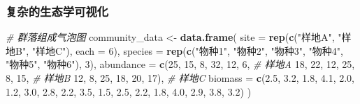 \documentclass[
]{book}
\newenvironment{Shaded}{\begin{snugshade}}{\end{snugshade}}
\newcommand{\AttributeTok}[1]{\textcolor[rgb]{0.13,0.29,0.53}{#1}}
\newcommand{\CommentTok}[1]{\textcolor[rgb]{0.56,0.35,0.01}{\textit{#1}}}
\newcommand{\DecValTok}[1]{\textcolor[rgb]{0.00,0.00,0.81}{#1}}
\newcommand{\FloatTok}[1]{\textcolor[rgb]{0.00,0.00,0.81}{#1}}
\newcommand{\FunctionTok}[1]{\textcolor[rgb]{0.13,0.29,0.53}{\textbf{#1}}}
\newcommand{\NormalTok}[1]{#1}
\newcommand{\OtherTok}[1]{\textcolor[rgb]{0.56,0.35,0.01}{#1}}
\newcommand{\StringTok}[1]{\textcolor[rgb]{0.31,0.60,0.02}{#1}}
\begin{document}
\hypertarget{ux590dux6742ux7684ux751fux6001ux5b66ux53efux89c6ux5316}{%
\subsubsection{复杂的生态学可视化}\label{ux590dux6742ux7684ux751fux6001ux5b66ux53efux89c6ux5316}}

\begin{Shaded}
\begin{Highlighting}[]
\CommentTok{\# 群落组成气泡图}
\NormalTok{community\_data }\OtherTok{\textless{}{-}} \FunctionTok{data.frame}\NormalTok{(}
  \AttributeTok{site =} \FunctionTok{rep}\NormalTok{(}\FunctionTok{c}\NormalTok{(}\StringTok{"样地A"}\NormalTok{, }\StringTok{"样地B"}\NormalTok{, }\StringTok{"样地C"}\NormalTok{), }\AttributeTok{each =} \DecValTok{6}\NormalTok{),}
  \AttributeTok{species =} \FunctionTok{rep}\NormalTok{(}\FunctionTok{c}\NormalTok{(}\StringTok{"物种1"}\NormalTok{, }\StringTok{"物种2"}\NormalTok{, }\StringTok{"物种3"}\NormalTok{, }\StringTok{"物种4"}\NormalTok{, }\StringTok{"物种5"}\NormalTok{, }\StringTok{"物种6"}\NormalTok{), }\DecValTok{3}\NormalTok{),}
  \AttributeTok{abundance =} \FunctionTok{c}\NormalTok{(}\DecValTok{25}\NormalTok{, }\DecValTok{15}\NormalTok{, }\DecValTok{8}\NormalTok{, }\DecValTok{32}\NormalTok{, }\DecValTok{12}\NormalTok{, }\DecValTok{6}\NormalTok{,   }\CommentTok{\# 样地A}
                \DecValTok{18}\NormalTok{, }\DecValTok{22}\NormalTok{, }\DecValTok{12}\NormalTok{, }\DecValTok{25}\NormalTok{, }\DecValTok{8}\NormalTok{, }\DecValTok{15}\NormalTok{,  }\CommentTok{\# 样地B}
                \DecValTok{12}\NormalTok{, }\DecValTok{8}\NormalTok{, }\DecValTok{25}\NormalTok{, }\DecValTok{18}\NormalTok{, }\DecValTok{20}\NormalTok{, }\DecValTok{17}\NormalTok{), }\CommentTok{\# 样地C}
  \AttributeTok{biomass =} \FunctionTok{c}\NormalTok{(}\FloatTok{2.5}\NormalTok{, }\FloatTok{3.2}\NormalTok{, }\FloatTok{1.8}\NormalTok{, }\FloatTok{4.1}\NormalTok{, }\FloatTok{2.0}\NormalTok{, }\FloatTok{1.2}\NormalTok{,}
              \FloatTok{3.0}\NormalTok{, }\FloatTok{2.8}\NormalTok{, }\FloatTok{2.2}\NormalTok{, }\FloatTok{3.5}\NormalTok{, }\FloatTok{1.5}\NormalTok{, }\FloatTok{2.5}\NormalTok{,}
              \FloatTok{2.2}\NormalTok{, }\FloatTok{1.8}\NormalTok{, }\FloatTok{4.0}\NormalTok{, }\FloatTok{2.9}\NormalTok{, }\FloatTok{3.8}\NormalTok{, }\FloatTok{3.2}\NormalTok{)}
\NormalTok{)}


\end{Highlighting}
\end{Shaded}
\end{document}
